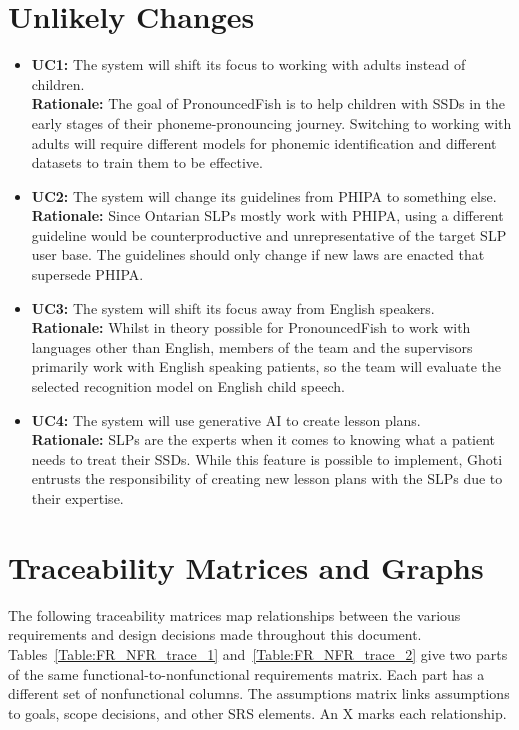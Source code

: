 \documentclass[12pt]{article}
\begin{document}
\section{Unlikely Changes} \label{sec:unlikely-changes}

\begin{itemize}

    \item \textbf{UC1:} The system will shift its focus to working with adults instead of children.\\
    \textbf{Rationale:} The goal of PronouncedFish is to help children with SSDs in the early stages of their phoneme-pronouncing journey. Switching to working with adults will require different models for phonemic identification and different datasets to train them to be effective.
    \item \textbf{UC2:} The system will change its guidelines from PHIPA to something else.\\
    \textbf{Rationale:} Since Ontarian SLPs mostly work with PHIPA, using a different guideline would be counterproductive and unrepresentative of the target SLP user base. The guidelines should only change if new laws are enacted that supersede PHIPA.
    \item \textbf{UC3:} The system will shift its focus away from English speakers.\\
    \textbf{Rationale:} Whilst in theory possible for PronouncedFish to work with languages other than English, members of the team and the supervisors primarily work with English speaking patients, so the team will evaluate the selected recognition model on English child speech.
    \item \textbf{UC4:} The system will use generative AI to create lesson plans.\\
    \textbf{Rationale:} SLPs are the experts when it comes to knowing what a patient needs to treat their SSDs. While this feature is possible to implement, Ghoti entrusts the responsibility of creating new lesson plans with the SLPs due to their expertise. 

\end{itemize}

\section{Traceability Matrices and Graphs} \label{sec:traceability}

The following traceability matrices map relationships between the various requirements and design
decisions made throughout this document. Tables~\ref{Table:FR_NFR_trace_1} and~\ref{Table:FR_NFR_trace_2} give
two parts of the same functional-to-nonfunctional requirements matrix. Each
part has a different set of nonfunctional columns. The assumptions matrix
links assumptions to goals, scope decisions, and other SRS elements.
An X marks each relationship.
\end{document}
